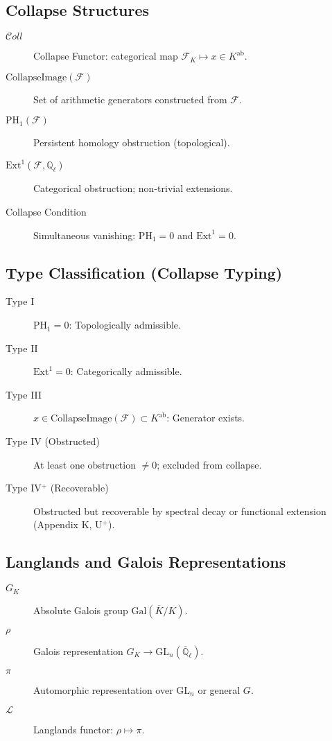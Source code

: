 \documentclass[11pt]{article}
\begin{document}
\subsection*{Collapse Structures}

\begin{description}
  \item[\( \mathcal{C}oll \)] Collapse Functor: categorical map \( \mathcal{F}_K \mapsto x \in K^{\mathrm{ab}} \).
  \item[\( \text{CollapseImage}(\mathcal{F}) \)] Set of arithmetic generators constructed from \( \mathcal{F} \).
  \item[\( \mathrm{PH}_1(\mathcal{F}) \)] Persistent homology obstruction (topological).
  \item[\( \mathrm{Ext}^1(\mathcal{F}, \mathbb{Q}_\ell) \)] Categorical obstruction; non-trivial extensions.
  \item[Collapse Condition] Simultaneous vanishing: \( \mathrm{PH}_1 = 0 \) and \( \mathrm{Ext}^1 = 0 \).
\end{description}

\subsection*{Type Classification (Collapse Typing)}

\begin{description}
  \item[Type I] \( \mathrm{PH}_1 = 0 \): Topologically admissible.
  \item[Type II] \( \mathrm{Ext}^1 = 0 \): Categorically admissible.
  \item[Type III] \( x \in \text{CollapseImage}(\mathcal{F}) \subset K^{\mathrm{ab}} \): Generator exists.
  \item[Type IV (Obstructed)] At least one obstruction \( \ne 0 \); excluded from collapse.
  \item[Type IV$^+$ (Recoverable)] Obstructed but recoverable by spectral decay or functional extension (Appendix K, U$^+$).
\end{description}

\subsection*{Langlands and Galois Representations}

\begin{description}
  \item[\( G_K \)] Absolute Galois group \( \mathrm{Gal}(\overline{K}/K) \).
  \item[\( \rho \)] Galois representation \( G_K \to \mathrm{GL}_n(\overline{\mathbb{Q}}_\ell) \).
  \item[\( \pi \)] Automorphic representation over \( \mathrm{GL}_n \) or general \( G \).
  \item[\( \mathcal{L} \)] Langlands functor: \( \rho \mapsto \pi \).
\end{description}
\end{document}
